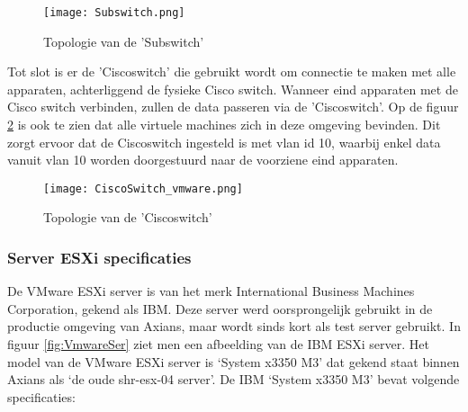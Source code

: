 \begin{figure}[H]
	\centering
	\texttt{[image: Subswitch.png]}
	\caption{Topologie van de 'Sub\textunderscore switch'}
	\label{fig:subswitch}
\end{figure}

\newline
Tot slot is er de 'Cisco\textunderscore switch' die gebruikt wordt om connectie te maken met alle apparaten, achterliggend de fysieke Cisco switch. Wanneer eind apparaten met de Cisco switch verbinden, zullen de data passeren via de 'Cisco\textunderscore switch'. Op de figuur \ref{fig:Ciscoswitch} is ook te zien dat alle virtuele machines zich in deze omgeving bevinden. Dit zorgt ervoor dat de Cisco\textunderscore switch ingesteld is met vlan id 10, waarbij enkel data vanuit vlan 10 worden doorgestuurd naar de voorziene eind apparaten.

\begin{figure}[H]
	\centering
	\texttt{[image: CiscoSwitch\_vmware.png]}
	\caption{Topologie van de 'Cisco\textunderscore switch'}
	\label{fig:Ciscoswitch}
\end{figure}

\subsubsection{Server ESXi specificaties}
De VMware ESXi server is van het merk International Business Machines Corporation, gekend als IBM. Deze server werd oorsprongelijk gebruikt in de productie omgeving van Axians, maar wordt sinds kort als test server gebruikt. In figuur \ref{fig:VmwareSer} ziet men een afbeelding van de IBM ESXi server.
\newline
\newline
Het model van de VMware ESXi server is ‘System x3350 M3’ dat gekend staat binnen Axians als ‘de oude shr-esx-04 server’. De IBM ‘System x3350 M3’ bevat volgende specificaties:


